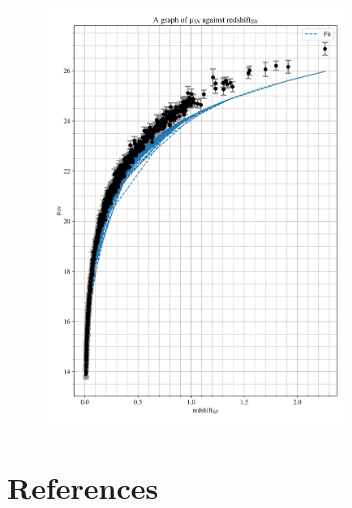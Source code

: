 \documentclass[12pt, a4paper]{article}
\begin{document}
\begin{figure}[]
    \centering
    \includegraphics[width = 0.7\textwidth]{Graph 5.png}
\end{figure}

\section{References}
\printbibliography[heading = none]
\end{document}
